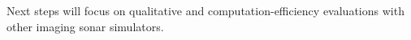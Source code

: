 \documentclass[final,5p,times]{elsarticle}
\begin{document}
Next steps will focus on qualitative and computation-efficiency evaluations with other imaging sonar simulators.















\end{document}
